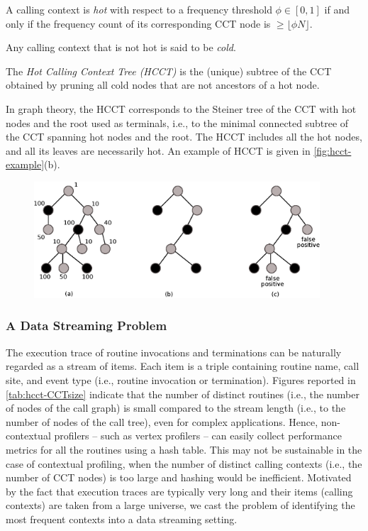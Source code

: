 \begin{definition}
A calling context is {\em hot} with respect to a frequency threshold $\phi\in[0,1]$ if and only if the frequency count of its corresponding CCT node is $\geq \lfloor\phi N\rfloor$. 
\end{definition}

\noindent Any calling context that is not hot is said to be {\em cold}. 

\begin{definition}
The {\em Hot Calling Context Tree (HCCT)} is the (unique) subtree of the CCT obtained by pruning all cold nodes that are not ancestors of a hot node.
\end{definition}

\noindent In graph theory, the HCCT corresponds to the Steiner tree of the CCT with hot nodes and the root used as terminals, i.e., to the minimal connected subtree of the CCT spanning hot nodes and the root. The HCCT includes all the hot nodes, and all its leaves are necessarily hot. An example of HCCT is given in \myfigure\ref{fig:hcct-example}(b). 

\ifdefined\noauthorea
\begin{figure}[ht]
\begin{center}
\includegraphics[width=0.95\textwidth]{figures/hcct-example/hcct-example.eps}
\caption{\protect}
\end{center}
\end{figure}
\fi

\subsubsection*{A Data Streaming Problem}
The execution trace of routine invocations and terminations can be naturally regarded as a stream of items. Each item is a triple containing routine name, call site, and event type (i.e., routine invocation or termination). Figures reported in \mytable\ref{tab:hcct-CCTsize} indicate that the number of distinct routines (i.e., the number of nodes of the call graph) is small compared to the stream length (i.e., to the number of nodes of the call tree), even for complex applications. Hence, non-contextual profilers -- such as vertex profilers -- can easily collect performance metrics for all the routines using a hash table. This may not be sustainable in the case of contextual profiling, when the number of distinct calling contexts (i.e., the number of CCT nodes) is too large and hashing would be inefficient. Motivated by the fact that execution traces are typically very long and their items (calling contexts) are taken from a large universe, we cast the problem of identifying the most frequent contexts into a data streaming setting.

